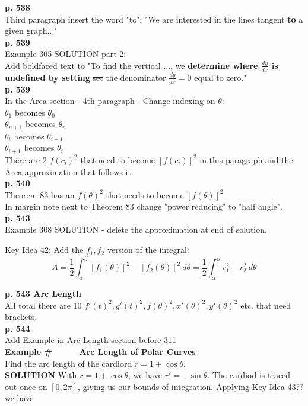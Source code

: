 \documentclass[11pt]{report}
\newlength\tindent
\renewcommand{\indent}{\hspace*{\tindent}}
\begin{document}
\textbf{p. 538}\\
Third paragraph insert the word "to": "We are interested in the lines tangent \textbf{to} a given graph..."\\

\textbf{p. 539}\\
Example 305 SOLUTION part 2:\\
Add boldfaced text to "To find the vertical ..., we \textbf{determine where $\frac{dy}{dx}$ is undefined by setting} \sout{set} the denominator \sout{ $\frac{dy}{dx}=0$} equal to zero."\\

\textbf{p. 539}\\
In the Area section - 4th paragraph - Change indexing on $\theta$:\\ 
$\theta_1$ becomes $\theta_0$\\
$\theta_{n+1}$ becomes $\theta_n$\\
$\theta_i$ becomes $\theta_{i-1}$\\
$\theta_{i+1}$ becomes $\theta_i$\\
There are 2 $f(c_i)^2$ that need to become $[f(c_i)]^2$ in this paragraph and the Area approximation that follows it.\\

\textbf{p. 540}\\
Theorem 83 has an $f(\theta)^2$ that needs to become $[f(\theta)]^2$\\
In margin note next to Theorem 83 change "power reducing" to "half angle".\\

\textbf{p. 543}\\
Example 308 SOLUTION - delete the approximation at end of solution.

Key Idea 42: Add the $f_1, f_2$ version of the integral: $$A = \frac{1}{2} \int_\alpha^\beta [f_1(\theta)]^2 - [f_2(\theta)]^2~d\theta = \frac{1}{2} \int_\alpha^\beta r_1^2 - r_2^2~d\theta$$

\textbf{p. 543 Arc Length}\\
All total there are 10 $f'(t)^2, g'(t)^2, f(\theta)^2, x'(\theta)^2, y'(\theta)^2$ etc. that need brackets.\\

\textbf{p. 544}\\
Add Example in Arc Length section before 311\\

\textbf{Example \#~~~~~ Arc Length of Polar Curves}\\
Find the arc length of the cardiord $r=1+\cos \theta$.\\
\textbf{SOLUTION} \indent With $r=1+\cos \theta$, we have $r' = -\sin \theta$. The cardiod is traced out once on $[0,2\pi]$, giving us our bounds of integration. Applying Key Idea 43?? we have\\
\end{document}

